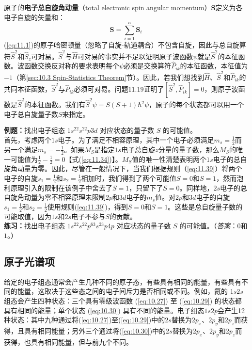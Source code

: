     原子的\textbf{电子总自旋角动量}（total electronic spin angular momentum）$\mathbf{S}$定义为各电子自旋的矢量和：
    \begin{equation}
        \mathbf{S} = \sum_{i=1}^{n} \mathbf{S}_i
        \label{eq:11.43}
    \end{equation}
    (\ref{eq:11.1})的原子哈密顿量（忽略了自旋-轨道耦合）不包含自旋，因此与总自旋算符$\hat{S}^2$和$\hat{S}_z$可对易。$\hat{S}^2$与$\hat{H}$可对易的事实并不足以证明原子波函数$\psi$就是$\hat{S}^2$的本征函数。波函数交换反对称的要求表明每个$\psi$必须是交换算符$\hat{P}_{ik}$的本征函数，本征值为$-1$（第\ref{sec:10.3 Spin-Statistics Theorem}节）。因此，若我们想找到$\hat{H}$、$\hat{S}^2$和$\hat{P}_{ik}$的共同本征函数，$\hat{S}^2$与$\hat{P}_{ik}$必须可对易。问题11.19证明了$\left[\hat{S}^2, \hat{P}_{ik}\right] = 0$，则原子波函数是$\hat{S}^2$的本征函数。我们有$\hat{S}^2\psi = S\left(S+1\right)\hbar^2\psi$，原子的每个状态都可以用一个电子总自旋量子数$S$来指定。

    \begin{examplebox}
        \textbf{例题：}找出电子组态 $1s^22s^22p3d$ 对应状态的量子数 $S$ 的可能值。
        \\

        首先，考虑两个$1s$电子。为了满足不相容原理，其中一个电子必须满足$m_s = \frac{1}{2}$而另一个满足$m_s = -\frac{1}{2}$。如果$M_S$是指定$1s$电子总自旋$z$分量的量子数，那么$M_S$的唯一可能值为$\frac{1}{2} - \frac{1}{2} = 0$【式(\ref{eq:11.34})】。$M_S$值的唯一性清楚表明两个$1s$电子的总自旋角动量为零。因此，尽管在一般情况下，当我们根据规则（\ref{eq:11.39}）将两个电子的自旋$s_1=\frac{1}{2}$和$s_2=\frac{1}{2}$相加时，我们得到了两个可能值$S=0$和$S=1$，然而泡利原理引入的限制在该例子中舍去了$S=1$，只留下了$S=0$。同样地，$2s$电子的总自旋角动量为零不相容原理未限制$2p$和$3d$电子的$m_s$值。对$2p$和$3d$电子的自旋$s_1 = \frac{1}{2}$和$s_2 = \frac{1}{2}$使用规则(\ref{eq:11.39})，得到$S=0$和$S=1$。这些是总自旋量子数的可能取值，因为$1s$和$2s$电子不参与$S$的贡献。
        \\

        \textbf{练习：}找出电子组态 $1s^22s^22p^63s^23p4p$ 对应状态的量子数 $S$ 的可能值。（\textit{答案}：$0$和$1$。）
    \end{examplebox}

\subsection*{原子光谱项}

    给定的电子组态通常会产生几种不同的原子态，有些具有相同的能量，有些具有不同的能量，这取决于这些态之间的电子间斥力是否相同或不同。例如，氦的 $1s2s$ 组态会产生四种状态：三个具有零级波函数 (\ref{eq:10.27}) 至 (\ref{eq:10.29}) 的状态都具有相同的能量；单个状态 (\ref{eq:10.30}) 具有不同的能量。电子组态$1s2p$会产生12种状态：其中九种通过将(\ref{eq:10.27})至(\ref{eq:10.29})中的$2s$替换为$2p_x$、$2p_y$和$2p_z$而获得，且具有相同能量；另外三个通过将(\ref{eq:10.30})中的$2s$替换为$2p_x$、$2p_y$和$2p_z$而获得，也具有相同能量，但与前九个不同。

